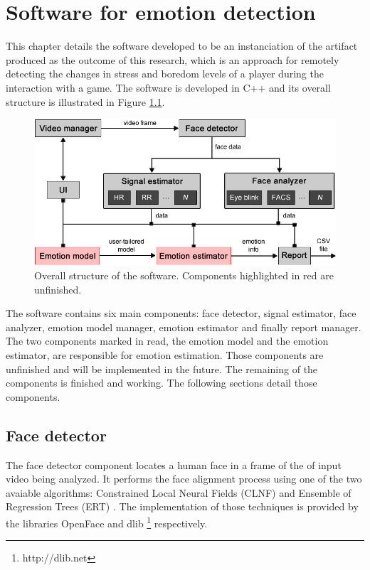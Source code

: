 \chapter{Software for emotion detection}
\label{ch:software}

This chapter details the software developed to be an instanciation of the artifact produced as the outcome of this research, which is an approach for remotely detecting the changes in stress and boredom levels of a player during the interaction with a game. The software is developed in C++ and its overall structure is illustrated in Figure \ref{fig:tool-overall-structure}.

\begin{figure}[h]
    \centering
    \includegraphics[width=\textwidth]{figures/tool-overall-structure.png}
    \caption{Overall structure of the software. Components highlighted in red are unfinished.}
    \label{fig:tool-overall-structure}
\end{figure}

The software contains six main components: face detector, signal estimator, face analyzer, emotion model manager, emotion estimator and finally report manager. The two components marked in read, the emotion model and the emotion estimator, are responsible for emotion estimation. Those components are unfinished and will be implemented in the future. The remaining of the components is finished and working. The following sections detail those components.

\section{Face detector}

The face detector component locates a human face in a frame of the of input video being analyzed. It performs the face alignment process using one of the two avaiable algorithms: Constrained Local Neural Fields (CLNF) \parencite{baltrusaitis2013constrained} and Ensemble of Regression Trees (ERT) \parencite{kazemi2014one}. The implementation of those techniques is provided by the libraries OpenFace \parencite{baltruvsaitis2016openface} and dlib \footnote{http://dlib.​net} respectively.

